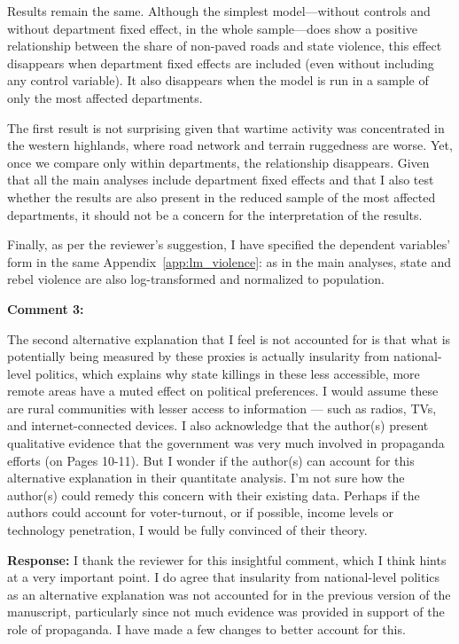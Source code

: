\documentclass[12pt, a4paper, notitlepage]{article}
\begin{document}
Results remain the same. Although the simplest model---without controls and without department fixed effect, in the whole sample---does show a positive relationship between the share of non-paved roads and state violence, this effect disappears when department fixed effects are included (even without including any control variable). It also disappears when the model is run in a sample of only the most affected departments.

The first result is not surprising given that wartime activity was concentrated in the western highlands, where road network and terrain ruggedness are worse. Yet, once we compare only within departments, the relationship disappears.
Given that all the main analyses include department fixed effects and that I also test whether the results are also present in the reduced sample of the most affected departments, it should not be a concern for the interpretation of the results.

Finally, as per the reviewer's suggestion, I have specified the dependent variables' form in the same Appendix~\ref{app:lm_violence}: as in the main analyses, state and rebel violence are also log-transformed and normalized to population.

\vspace{15pt}
\noindent\textbf{Comment 3:}
\begin{displayquote}
The second alternative explanation that I feel is not accounted for is that what is potentially being measured by these proxies is actually insularity from national- level politics, which explains why state killings in these less accessible, more remote areas have a muted effect on political preferences. I would assume these are rural communities with lesser access to information — such as radios, TVs, and internet-connected devices. I also acknowledge that the author(s) present qualitative evidence that the government was very much involved in propaganda efforts (on Pages 10-11). But I wonder if the author(s) can account for this alternative explanation in their quantitate analysis. I’m not sure how the author(s) could remedy this concern with their existing data. Perhaps if the authors could account for voter-turnout, or if possible, income levels or technology penetration, I would be fully convinced of their theory.
\end{displayquote}

\noindent\textbf{Response:} I thank the reviewer for this insightful comment, which I think hints at a very important point. I do agree that insularity from national-level politics as an alternative explanation was not accounted for in the previous version of the manuscript, particularly since not much evidence was provided in support of the role of propaganda. I have made a few changes to better account for this.
\end{document}
